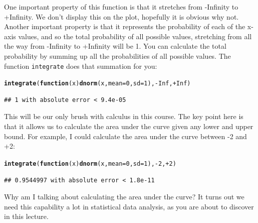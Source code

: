 \documentclass[12pt]{book}\usepackage[]{graphicx}\usepackage[]{color}
\makeatletter
\newcommand{\hlnum}[1]{\textcolor[rgb]{0.686,0.059,0.569}{#1}}%
\newcommand{\hlopt}[1]{\textcolor[rgb]{0,0,0}{#1}}%
\newcommand{\hlstd}[1]{\textcolor[rgb]{0.345,0.345,0.345}{#1}}%
\newcommand{\hlkwa}[1]{\textcolor[rgb]{0.161,0.373,0.58}{\textbf{#1}}}%
\newcommand{\hlkwc}[1]{\textcolor[rgb]{0.333,0.667,0.333}{#1}}%
\newcommand{\hlkwd}[1]{\textcolor[rgb]{0.737,0.353,0.396}{\textbf{#1}}}%
\newenvironment{kframe}{%
 \def\at@end@of@kframe{}%
 \ifinner\ifhmode%
  \def\at@end@of@kframe{\end{minipage}}%
  \begin{minipage}{\columnwidth}%
 \fi\fi%
 \def\FrameCommand##1{\hskip\@totalleftmargin \hskip-\fboxsep
 \colorbox{shadecolor}{##1}\hskip-\fboxsep
     \hskip-\linewidth \hskip-\@totalleftmargin \hskip\columnwidth}%
 \MakeFramed {\advance\hsize-\width
   \@totalleftmargin\z@ \linewidth\hsize
   \@setminipage}}%
 {\par\unskip\endMakeFramed%
 \at@end@of@kframe}
\newenvironment{knitrout}{}{} %
\makeatother
\begin{document}
One important property of this function is that it stretches from -Infinity to +Infinity. We don't display this on the plot, hopefully it is obvious why not. Another important property is that it represents the probability of each of the x-axis values, and so the total probability of all possible values, stretching from all the way from -Infinity to +Infinity will be 1. You can calculate the total probability by summing up all the probabilities of all possible values. The function \texttt{integrate} does that summation for you:

\begin{knitrout}
\color{fgcolor}\begin{kframe}
\begin{alltt}
\hlkwd{integrate}\hlstd{(}\hlkwa{function}\hlstd{(}\hlkwc{x}\hlstd{)} \hlkwd{dnorm}\hlstd{(x,} \hlkwc{mean} \hlstd{=} \hlnum{0}\hlstd{,} \hlkwc{sd} \hlstd{=} \hlnum{1}\hlstd{),} \hlopt{-}\hlnum{Inf}\hlstd{,} \hlopt{+}\hlnum{Inf}\hlstd{)}
\end{alltt}
\begin{verbatim}
## 1 with absolute error < 9.4e-05
\end{verbatim}
\end{kframe}
\end{knitrout}

This will be our only brush with calculus in this course. The key point here is that it allows us to calculate the area under the curve given any lower and upper bound. For example, I could calculate the area under the curve between -2 and +2:

\begin{knitrout}
\color{fgcolor}\begin{kframe}
\begin{alltt}
\hlkwd{integrate}\hlstd{(}\hlkwa{function}\hlstd{(}\hlkwc{x}\hlstd{)} \hlkwd{dnorm}\hlstd{(x,} \hlkwc{mean} \hlstd{=} \hlnum{0}\hlstd{,} \hlkwc{sd} \hlstd{=} \hlnum{1}\hlstd{),} \hlopt{-}\hlnum{2}\hlstd{,} \hlopt{+}\hlnum{2}\hlstd{)}
\end{alltt}
\begin{verbatim}
## 0.9544997 with absolute error < 1.8e-11
\end{verbatim}
\end{kframe}
\end{knitrout}

Why am I talking about calculating the area under the curve? It turns out we need this capability a lot in statistical data analysis, as you are about to discover in this lecture. 
\end{document}
